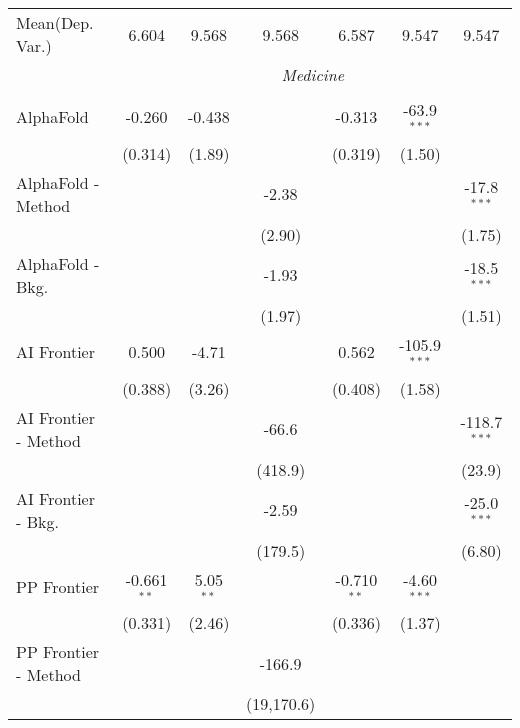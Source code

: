 \begin{tabular}{lcccccc}
Mean(Dep. Var.) & 6.604 & 9.568 & 9.568 & 6.587 & 9.547 & 9.547 \\
 & \multicolumn{6}{c}{\textit{Medicine}} \\ \\
   AlphaFold            & -0.260        & -0.438      &             & -0.313        & -63.9$^{***}$  &   \\   
                        & (0.314)       & (1.89)      &             & (0.319)       & (1.50)         &   \\   
   AlphaFold - Method   &               &             & -2.38       &               &                & -17.8$^{***}$\\   
                        &               &             & (2.90)      &               &                & (1.75)\\   
   AlphaFold - Bkg.     &               &             & -1.93       &               &                & -18.5$^{***}$\\   
                        &               &             & (1.97)      &               &                & (1.51)\\   
   AI Frontier          & 0.500         & -4.71       &             & 0.562         & -105.9$^{***}$ &   \\   
                        & (0.388)       & (3.26)      &             & (0.408)       & (1.58)         &   \\   
   AI Frontier - Method &               &             & -66.6       &               &                & -118.7$^{***}$\\   
                        &               &             & (418.9)     &               &                & (23.9)\\   
   AI Frontier - Bkg.   &               &             & -2.59       &               &                & -25.0$^{***}$\\   
                        &               &             & (179.5)     &               &                & (6.80)\\   
   PP Frontier          & -0.661$^{**}$ & 5.05$^{**}$ &             & -0.710$^{**}$ & -4.60$^{***}$  &   \\   
                        & (0.331)       & (2.46)      &             & (0.336)       & (1.37)         &   \\   
   PP Frontier - Method &               &             & -166.9      &               &                &   \\   
                        &               &             & (19,170.6)  &               &                &   \\   

\end{tabular}
